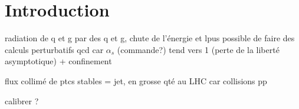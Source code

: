 \section{Introduction}\label{chapter-JERC-section-introduction}

radiation de q et g par des q et g, chute de l'énergie et lpus possible de faire des calculs perturbatifs qcd car $\alpha_s$ (commande?) tend vers 1 (perte de la liberté asymptotique) + confinement

flux collimé de ptcs stables = jet, en grosse qté au LHC car collisions pp

calibrer ?


